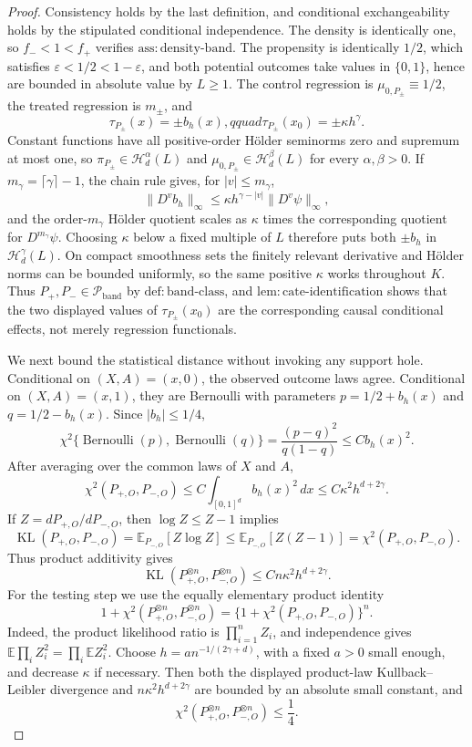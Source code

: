 \documentclass{article}
\begin{document}
\begin{proof}
Consistency holds by the last definition, and conditional exchangeability holds by the stipulated conditional independence.  The density is identically one, so \(f_{-}<1<f_{+}\) verifies \(\mathrm{ass:density\mbox{-}band}\).  The propensity is identically \(1/2\), which satisfies \(\varepsilon<1/2<1-\varepsilon\), and both potential outcomes take values in \(\{0,1\}\), hence are bounded in absolute value by \(L\geq1\).  The control regression is \(\mu_{0,P_\pm}\equiv1/2\), the treated regression is \(m_\pm\), and
\[
 \tau_{P_\pm}(x)=\pm b_h(x),qquad
 \tau_{P_\pm}(x_0)=\pm\kappa h^\gamma.
\]
Constant functions have all positive-order H\"older seminorms zero and supremum at most one, so \(\pi_{P_\pm}\in\mathcal H_d^\alpha(L)\) and \(\mu_{0,P_\pm}\in\mathcal H_d^\beta(L)\) for every \(\alpha,\beta>0\).  If \(m_\gamma=\lceil\gamma\rceil-1\), the chain rule gives, for \(|v|\leq m_\gamma\),
\[
 \|D^v b_h\|_\infty\leq \kappa h^{\gamma-|v|}\|D^v\psi\|_\infty,
\]
and the order-\(m_\gamma\) H\"older quotient scales as \(\kappa\) times the corresponding quotient for \(D^{m_\gamma}\psi\).  Choosing \(\kappa\) below a fixed multiple of \(L\) therefore puts both \(\pm b_h\) in \(\mathcal H_d^\gamma(L)\).  On compact smoothness sets the finitely relevant derivative and H\"older norms can be bounded uniformly, so the same positive \(\kappa\) works throughout \(K\).  Thus \(P_+,P_-\in\mathcal P_{\mathrm{band}}\) by \(\mathrm{def:band\mbox{-}class}\), and \(\mathrm{lem:cate\mbox{-}identification}\) shows that the two displayed values of \(\tau_{P_\pm}(x_0)\) are the corresponding causal conditional effects, not merely regression functionals.

We next bound the statistical distance without invoking any support hole.  Conditional on \((X,A)=(x,0)\), the observed outcome laws agree.  Conditional on \((X,A)=(x,1)\), they are Bernoulli with parameters \(p=1/2+b_h(x)\) and \(q=1/2-b_h(x)\).  Since \(|b_h|\leq1/4\),
\[
 \chi^2\{\operatorname{Bernoulli}(p),\operatorname{Bernoulli}(q)\}
 =\frac{(p-q)^2}{q(1-q)}\leq Cb_h(x)^2.
\]
After averaging over the common laws of \(X\) and \(A\),
\[
 \chi^2(P_{+,O},P_{-,O})\leq C\int_{[0,1]^d}b_h(x)^2\,dx
 \leq C\kappa^2h^{d+2\gamma}.
\]
If \(Z=dP_{+,O}/dP_{-,O}\), then \(\log Z\leq Z-1\) implies
\[
 \operatorname{KL}(P_{+,O},P_{-,O})
 =\mathbb E_{P_{-,O}}[Z\log Z]
 \leq\mathbb E_{P_{-,O}}[Z(Z-1)]
 =\chi^2(P_{+,O},P_{-,O}).
\]
Thus product additivity gives
\[
 \operatorname{KL}(P_{+,O}^{\otimes n},P_{-,O}^{\otimes n})
 \leq Cn\kappa^2h^{d+2\gamma}.
\]
For the testing step we use the equally elementary product identity
\[
 1+\chi^2(P_{+,O}^{\otimes n},P_{-,O}^{\otimes n})
 =\{1+\chi^2(P_{+,O},P_{-,O})\}^n.
\]
Indeed, the product likelihood ratio is \(\prod_{i=1}^n Z_i\), and independence gives \(\mathbb E\prod_iZ_i^2=\prod_i\mathbb EZ_i^2\).
Choose \(h=a n^{-1/(2\gamma+d)}\), with a fixed \(a>0\) small enough, and decrease \(\kappa\) if necessary.  Then both the displayed product-law Kullback--Leibler divergence and \(n\kappa^2h^{d+2\gamma}\) are bounded by an absolute small constant, and
\[
 \chi^2(P_{+,O}^{\otimes n},P_{-,O}^{\otimes n})\leq\frac14.
\]


\end{proof}
\end{document}
